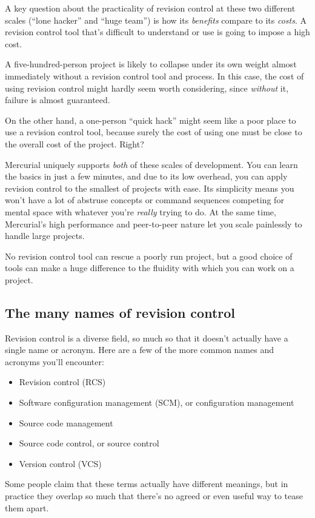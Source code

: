 A key question about the practicality of revision control at these two
different scales (``lone hacker'' and ``huge team'') is how its
\emph{benefits} compare to its \emph{costs}.  A revision control tool
that's difficult to understand or use is going to impose a high cost.

A five-hundred-person project is likely to collapse under its own
weight almost immediately without a revision control tool and process.
In this case, the cost of using revision control might hardly seem
worth considering, since \emph{without} it, failure is almost
guaranteed.

On the other hand, a one-person ``quick hack'' might seem like a poor
place to use a revision control tool, because surely the cost of using
one must be close to the overall cost of the project.  Right?

Mercurial uniquely supports \emph{both} of these scales of
development.  You can learn the basics in just a few minutes, and due
to its low overhead, you can apply revision control to the smallest of
projects with ease.  Its simplicity means you won't have a lot of
abstruse concepts or command sequences competing for mental space with
whatever you're \emph{really} trying to do.  At the same time,
Mercurial's high performance and peer-to-peer nature let you scale
painlessly to handle large projects.

No revision control tool can rescue a poorly run project, but a good
choice of tools can make a huge difference to the fluidity with which
you can work on a project.

\subsection{The many names of revision control}

Revision control is a diverse field, so much so that it doesn't
actually have a single name or acronym.  Here are a few of the more
common names and acronyms you'll encounter:
\begin{itemize}
\item Revision control (RCS)
\item Software configuration management (SCM), or configuration management
\item Source code management
\item Source code control, or source control
\item Version control (VCS)
\end{itemize}
Some people claim that these terms actually have different meanings,
but in practice they overlap so much that there's no agreed or even
useful way to tease them apart.

